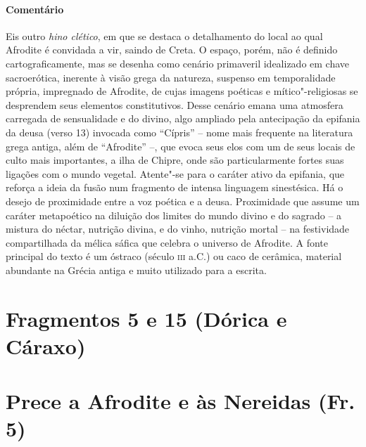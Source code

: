 \pagebreak
{\paragraph{Comentário} Eis outro \textit{hino clético}, em que se destaca o detalhamento do local ao
qual Afrodite é convidada a vir, saindo de Creta. O espaço, porém, não é
definido cartograficamente, mas se desenha como cenário primaveril idealizado
em chave sacroerótica, inerente à visão grega da natureza, suspenso em
temporalidade própria, impregnado de Afrodite, de cujas imagens poéticas e
mítico"-religiosas se desprendem seus elementos constitutivos. Desse cenário
emana uma atmosfera carregada de sensualidade e do divino, algo ampliado pela
antecipação da epifania da deusa (verso 13) invocada como ``Cípris'' --
nome mais frequente na literatura grega antiga, além de “Afrodite” --, que evoca
seus elos com um de seus locais de culto mais importantes, a ilha de Chipre,
onde são particularmente fortes suas ligações com o mundo vegetal. Atente"-se
para o caráter ativo da epifania, que reforça a ideia da fusão num fragmento de intensa linguagem sinestésica. Há o desejo de proximidade
entre a voz poética e a deusa. Proximidade que assume um caráter metapoético na diluição dos limites do mundo divino e do sagrado -- a mistura do néctar, nutrição divina, e do vinho, nutrição mortal -- na festividade compartilhada da mélica sáfica que celebra o universo de Afrodite. A fonte principal do texto é um óstraco (século \textsc{iii} a.C.) ou caco de cerâmica, material abundante na Grécia antiga e muito utilizado para a
escrita.}


\pagebreak

\section{Fragmentos 5 e 15 (Dórica e Cáraxo)}

\section{Prece a Afrodite e às Nereidas (Fr.\,5)}

